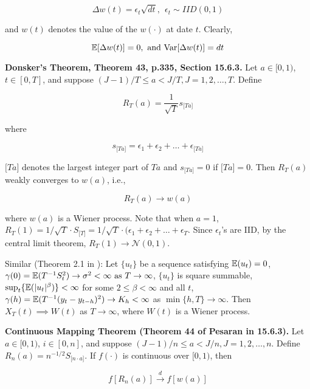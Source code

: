 \[
\Delta w(t) = \epsilon_t \sqrt{dt}, \ \ \epsilon_t \sim IID(0, 1)
\]

and \(w(t)\) denotes the value of the \(w(\cdot)\) at date \(t\). Clearly,

\[
\mathbb{E}[\Delta w(t)] = 0, \text{ and } \mathrm{Var}[ \Delta w(t)] = dt
\]

\begin{theorem}\label{stoch.donsker}\textbf{Donsker's Theorem, Theorem 43, p.335, Section 15.6.3.} Let \(a \in [0, 1)\), \(t \in [0, T]\), and suppose \((J - 1)/T \leq a < J/T, J = 1, 2, \ldots, T\). Define

\[
R_T(a) = \frac{1}{\sqrt{T}} s_{ \big[Ta \big] }
\]

where

\[
s_{ \big[Ta \big] } = \epsilon_1 + \epsilon_2 + \ldots + \epsilon_{ \big[Ta \big] }
\]

\(\big[Ta \big]\) denotes the largest integer part of \(Ta\) and \(s_{ \big[Ta \big] } = 0\) if \(\big[Ta \big] = 0\). Then \(R_T(a)\) weakly converges to \(w(a)\), i.e., 

\[
R_T(a) \to w(a)
\]

where \(w(a)\) is a Wiener process. Note that when \(a = 1\), \(R_T(1) = 1/\sqrt{T} \cdot S_{\big[T \big]} = 1/\sqrt{T} \cdot (\epsilon_1 + \epsilon_2 + \ldots + \epsilon_T\). Since \(\epsilon_t\)'s are IID, by the central limit theorem, \(R_T(1) \to \mathcal{N}(0, 1)\). 

\end{theorem}

Similar (Theorem 2.1 in \citet{Phillips1986}): Let \(\{u_t\}\) be a sequence satisfying \(\mathbb{E}(u_t) = 0\), \( \gamma(0) = \mathbb{E}(T^{-1}S_t ^2) \to \sigma^2 < \infty \text{ as } T \to \infty\), \(\{u_t\}\) is square summable, \(\sup_t \{ \mathbb{E}( |u_t|^\beta) \} < \infty\) for some \(2 \leq \beta < \infty\) and all \(t\), \(\gamma(h) = \mathbb{E}(T^{-1}(y_t - y_{t-h})^2) \to K_h < \infty\) as \(\min \{h, T\} \to \infty\). Then \(X_T(t) \implies W(t)\) as \(T \to \infty\), where \(W(t)\) is a Wiener process.

\begin{theorem}\label{stoch.cont.map} \textbf{Continuous Mapping Theorem (Theorem 44 of Pesaran in 15.6.3).} Let \(a \in [0, 1)\), \(i \in [0, n]\), and suppose \((J-1)/n \leq a < J/n, J = 1, 2, \ldots, n\). Define \(R_n(a) = n^{-1/2} S_{\big[ n \cdot a \big] }\). If \(f(\cdot)\) is continuous over \([0, 1)\), then 

\[
f[R_n(a)] \xrightarrow{d} f[w(a)]
\]

\end{theorem}

%
%
%
%
%
%
%
%






%
%
%